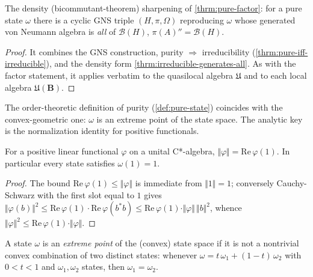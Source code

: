 \begin{theorem}
    \label{thrm:pure-generates-all}
    \leanok
    The density (bicommutant-theorem) sharpening of \ref{thrm:pure-factor}: for a pure state $\omega$ there is a cyclic GNS triple $(H, \pi, \Omega)$ reproducing $\omega$ whose generated von Neumann algebra is \emph{all} of $\mathcal{B}(H)$, $\pi(A)'' = \mathcal{B}(H)$.
\end{theorem}
\begin{proof}
    \leanok
    It combines the GNS construction, purity $\Rightarrow$ irreducibility (\ref{thrm:pure-iff-irreducible}), and the density form \ref{thrm:irreducible-generates-all}. As with the factor statement, it applies verbatim to the quasilocal algebra $\mathfrak{U}$ and to each local algebra $\mathfrak{U}(\mathbf{B})$.
\end{proof}

The order-theoretic definition of purity (\ref{def:pure-state}) coincides with the convex-geometric one: $\omega$ is an extreme point of the state space. The analytic key is the normalization identity for positive functionals.

\begin{theorem}
    \label{thrm:norm-positive-functional}
    \leanok
    For a positive linear functional $\varphi$ on a unital C*-algebra, $\Vert\varphi\Vert = \mathrm{Re}\,\varphi(1)$. In particular every state satisfies $\omega(1) = 1$.
\end{theorem}
\begin{proof}
    \leanok
    The bound $\mathrm{Re}\,\varphi(1) \le \Vert\varphi\Vert$ is immediate from $\Vert 1\Vert = 1$; conversely Cauchy-Schwarz with the first slot equal to $1$ gives $\Vert\varphi(b)\Vert^2 \le \mathrm{Re}\,\varphi(1)\cdot\mathrm{Re}\,\varphi(b^* b) \le \mathrm{Re}\,\varphi(1)\cdot\Vert\varphi\Vert\,\Vert b\Vert^2$, whence $\Vert\varphi\Vert^2 \le \mathrm{Re}\,\varphi(1)\cdot\Vert\varphi\Vert$.
\end{proof}

\begin{definition}
    \label{def:extreme-state}
    \leanok
    A state $\omega$ is an \emph{extreme point} of the (convex) state space if it is not a nontrivial convex combination of two distinct states: whenever $\omega = t\,\omega_1 + (1-t)\,\omega_2$ with $0 < t < 1$ and $\omega_1, \omega_2$ states, then $\omega_1 = \omega_2$.
\end{definition}


